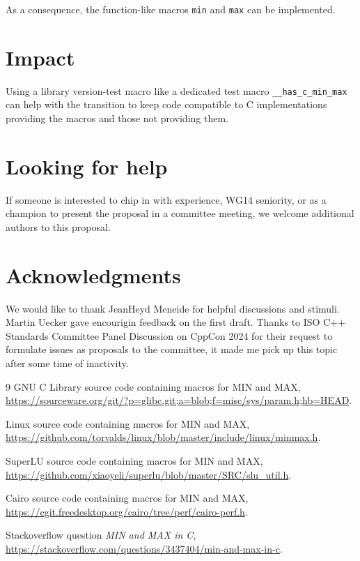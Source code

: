 \documentclass[a4paper,10pt]{scrartcl}
\begin{document}
As a consequence, the function-like macros \lstinline{min} and \lstinline{max} can be implemented.

\section{Impact}
Using a library version-test macro like a dedicated test macro \lstinline{__has_c_min_max} can
help with the transition to keep code compatible to C implementations providing the macros and
those not providing them.

\section{Looking for help}
If someone is interested to chip in with experience, WG14 seniority, or as a champion to present the proposal in a committee meeting, we welcome additional authors to this proposal.

\section{Acknowledgments}
We would like to thank JeanHeyd Meneide for helpful discussions and stimuli.
Martin Uecker gave encourigin feedback on the first draft.
Thanks to ISO C++ Standards Committee Panel Discussion on CppCon 2024 for their request to formulate
issues as proposals to the committee, it made me pick up this topic after some time of inactivity.

\begin{thebibliography}{9}
GNU C Library source code containing macros for MIN and MAX, \url{https://sourceware.org/git/?p=glibc.git;a=blob;f=misc/sys/param.h;hb=HEAD}.

Linux source code containing macros for MIN and MAX, \url{https://github.com/torvalds/linux/blob/master/include/linux/minmax.h}.

SuperLU source code containing macros for MIN and MAX,\\ \url{https://github.com/xiaoyeli/superlu/blob/master/SRC/slu_util.h}.

Cairo source code containing macros for MIN and MAX,\\ \url{https://cgit.freedesktop.org/cairo/tree/perf/cairo-perf.h}.

Stackoverflow question \emph{MIN and MAX in C},\\ \url{https://stackoverflow.com/questions/3437404/min-and-max-in-c}.
\end{thebibliography}
\end{document}
